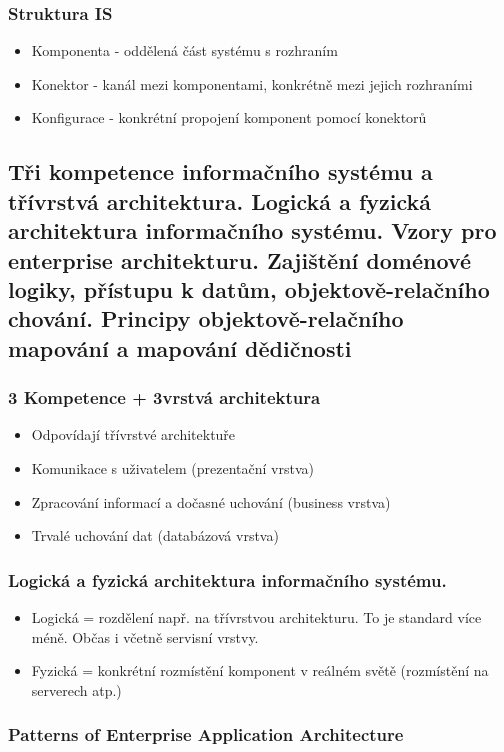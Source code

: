 \documentclass[10pt,a4paper]{article}
\begin{document}
\subsubsection{Struktura IS}
\begin{itemize}
\item Komponenta - oddělená část systému s rozhraním
\item Konektor - kanál mezi komponentami, konkrétně mezi jejich rozhraními
\item Konfigurace - konkrétní propojení komponent pomocí konektorů
\end{itemize}
\subsection{Tři kompetence informačního systému a třívrstvá architektura. Logická a fyzická architektura informačního systému. Vzory pro enterprise architekturu. Zajištění doménové logiky, přístupu k datům, objektově-relačního chování. Principy objektově-relačního mapování a mapování dědičnosti}

\subsubsection{3 Kompetence + 3vrstvá architektura}
\begin{itemize}
\item Odpovídají třívrstvé architektuře
\item Komunikace s uživatelem (prezentační vrstva)
\item Zpracování informací a dočasné uchování (business vrstva)
\item Trvalé uchování dat (databázová vrstva)
\end{itemize}
\subsubsection{Logická a fyzická architektura informačního systému.}
\begin{itemize}
\item Logická = rozdělení např. na třívrstvou architekturu. To je standard více méně. Občas i včetně servisní vrstvy.
\item Fyzická = konkrétní rozmístění komponent v reálném světě (rozmístění na serverech atp.)
\end{itemize}
\subsubsection{Patterns of Enterprise Application Architecture}
\end{document}
